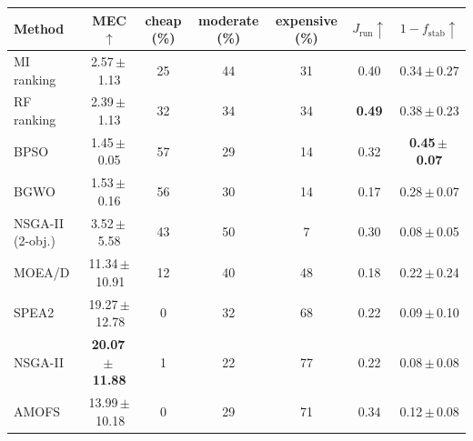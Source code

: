 \begin{tabular}{lcccccc}
\toprule
Method & MEC$\uparrow$ & cheap (\%) & moderate (\%) & expensive (\%) & $J_{\mathrm{run}}\uparrow$ & $1-f_{\mathrm{stab}}\uparrow$ \\
\midrule
MI ranking & 2.57\,$\pm$\,1.13 & 25 & 44 & 31 & 0.40 & 0.34\,$\pm$\,0.27 \\
RF ranking & 2.39\,$\pm$\,1.13 & 32 & 34 & 34 & \textbf{0.49} & 0.38\,$\pm$\,0.23 \\
BPSO & 1.45\,$\pm$\,0.05 & 57 & 29 & 14 & 0.32 & \textbf{0.45\,$\pm$\,0.07} \\
BGWO & 1.53\,$\pm$\,0.16 & 56 & 30 & 14 & 0.17 & 0.28\,$\pm$\,0.07 \\
NSGA-II (2-obj.) & 3.52\,$\pm$\,5.58 & 43 & 50 & 7 & 0.30 & 0.08\,$\pm$\,0.05 \\
MOEA/D & 11.34\,$\pm$\,10.91 & 12 & 40 & 48 & 0.18 & 0.22\,$\pm$\,0.24 \\
SPEA2 & 19.27\,$\pm$\,12.78 & 0 & 32 & 68 & 0.22 & 0.09\,$\pm$\,0.10 \\
NSGA-II & \textbf{20.07\,$\pm$\,11.88} & 1 & 22 & 77 & 0.22 & 0.08\,$\pm$\,0.08 \\
AMOFS & 13.99\,$\pm$\,10.18 & 0 & 29 & 71 & 0.34 & 0.12\,$\pm$\,0.08 \\
\bottomrule
\end{tabular}
